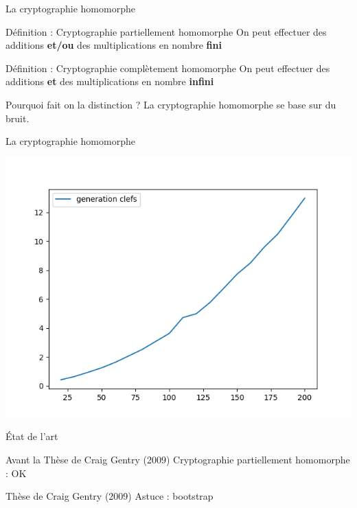 \begin{frame}{La cryptographie homomorphe}

\begin{block}{Définition : Cryptographie partiellement homomorphe}
On peut effectuer des additions \textbf{et/ou} des multiplications en nombre \textbf{fini}
\end{block}

\begin{block}{Définition : Cryptographie complètement homomorphe}
On peut effectuer des additions \textbf{et} des multiplications en nombre \textbf{infini} 
\end{block}

\begin{alertblock}{Pourquoi fait on la distinction ?}
La cryptographie homomorphe se base sur du bruit.
\end{alertblock}

\end{frame}

\begin{frame}{La cryptographie homomorphe}
    \begin{center}
    \includegraphics[scale=0.49]{images/generationClef.png} 
    \end{center}
\end{frame}{}

\begin{frame}{État de l'art}
    \begin{alertblock}{Avant la Thèse de Craig Gentry (2009)}
    Cryptographie partiellement homomorphe : OK
    \end{alertblock}
    \begin{alertblock}{Thèse de Craig Gentry (2009)}
    Astuce : bootstrap
    \end{alertblock}
\end{frame}{}



